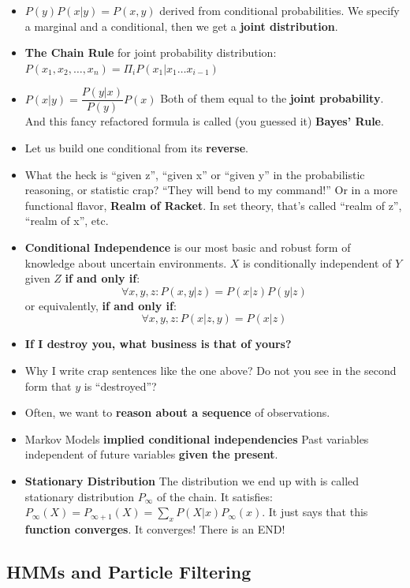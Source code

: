 \documentclass[twocolumn]{article}
\begin{document}
\begin{itemize}
\item $P(y)P(x|y)=P(x,y)$ derived from conditional probabilities. We
  specify a marginal and a conditional, then we get a \textbf{joint
    distribution}.
\item \textbf{The Chain Rule} for joint probability distribution:
  $P(x_{1},x_{2},\ldots,x_{n})=\Pi_{i}P(x_{1}|x_{1}\ldots x_{i-1})$
\item $P(x|y)=\dfrac{P(y|x)}{P(y)}P(x)$ Both of them equal to the
  \textbf{joint probability}. And this fancy refactored formula is
  called (you guessed it) \textbf{Bayes' Rule}.
\item Let us build one conditional from its \textbf{reverse}.
\item What the heck is ``given z'', ``given x'' or ``given y'' in the
  probabilistic reasoning, or statistic crap? ``They will bend to my
  command!'' Or in a more functional flavor, \textbf{Realm of
    Racket}. In set theory, that's called ``realm of z'', ``realm of
  x'', etc.
\item \textbf{Conditional Independence} is our most basic and robust
  form of knowledge about uncertain environments. $X$ is conditionally
  independent of $Y$ given $Z$ \textbf{if and only if}:
  $$ \forall x,y,z: P(x,y|z)=P(x|z)P(y|z)$$ or equivalently,
  \textbf{if and only if}:
  $$\forall x,y,z:P(x|z,y)=P(x|z)$$
\item {\color{red}\textbf{If I destroy you, what business is that of
      yours?}}
\item Why I write  crap sentences like the one above? Do not you see
  in the second form that $y$ is ``destroyed''?
\item Often, we want to \textbf{reason about a sequence} of
  observations. 
\item Markov Models \textbf{implied conditional independencies} Past
  variables independent of future variables \textbf{given the
    present}.
\item \textbf{Stationary Distribution} The distribution we end up with
  is called stationary distribution $P_{\infty}$ of the chain. It
  satisfies:
  $P_{\infty}(X)=P_{\infty+1}(X)=\sum_{x}P(X|x)P_{\infty}(x)$. It just
  says that this \textbf{function converges}. It converges! There is
  an END!\@
\end{itemize}


\subsection{HMMs and Particle Filtering}
\label{sec:hmms-part-filt}
\end{document}
